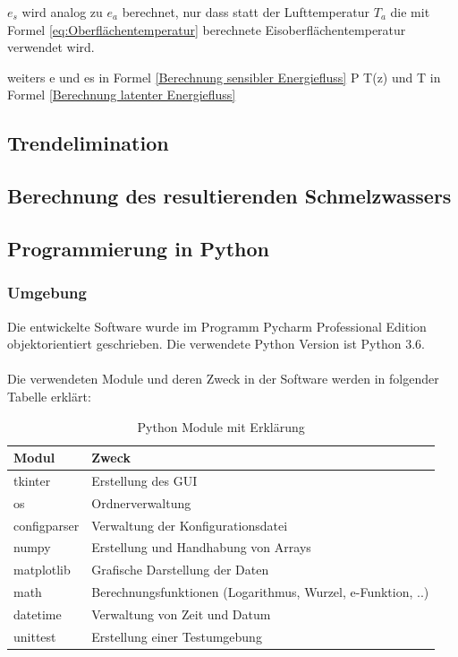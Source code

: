 \documentclass[12pt,a4paper]{article}
\begin{document}
$e_s$ wird analog zu $e_a$ berechnet, nur dass statt der Lufttemperatur $T_a$ die mit Formel \ref{eq:Oberflächentemperatur} berechnete Eisoberflächentemperatur verwendet wird.

weiters e und es in Formel \ref{Berechnung sensibler Energiefluss}
P T(z) und T in Formel \ref{Berechnung latenter Energiefluss} 


\subsection{Trendelimination}

\subsection{Berechnung des resultierenden Schmelzwassers}


\subsection{Programmierung in Python}
\subsubsection{Umgebung}

Die entwickelte Software wurde im Programm Pycharm Professional Edition objektorientiert geschrieben. Die verwendete Python Version ist Python 3.6.\\\\
Die verwendeten Module und deren Zweck in der Software werden in folgender Tabelle erklärt:


\begin{table}[H]
\centering
{} 
\caption{Python Module mit Erklärung}
\label{tab:Python Module}
\begin{tabular}{|l|l|}
\hline
\textbf{Modul} & \textbf{Zweck}                                \\ \hline
tkinter             & Erstellung des GUI         \\
os             & Ordnerverwaltung         \\
configparser             & Verwaltung der Konfigurationsdatei         \\
numpy          & Erstellung und Handhabung von Arrays          \\
matplotlib     & Grafische Darstellung der Daten               \\
math		   & Berechnungsfunktionen (Logarithmus, Wurzel, e-Funktion, ..)   \\  
datetime		   & Verwaltung von Zeit und Datum   \\
unittest		   & Erstellung einer Testumgebung   \\  \hline


\end{tabular}
\end{table}
\vspace{0.3cm}
\end{document}
